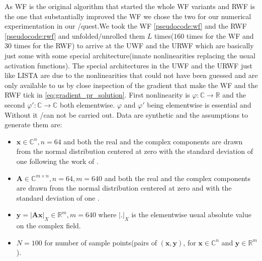As \ac{WF} is the original algorithm that started the whole \ac{WF} variants and \ac{RWF} is the one that substantially improved the \ac{WF} we chose the two 
for our numerical experimentation in our \du/\au quest.We took the \ac{WF}\cite{Candes2014} \cref{pseudocode:wf} and the 
\ac{RWF}\cite{Zhang2016} \cref{pseudocode:rwf} and unfolded/unrolled them $L$ times($160$ times for the \ac{WF} and $30$ times for 
the \ac{RWF}) to arrive at the \ac{UWF} and the \ac{URWF} which are basically just some \nn\cite{Goodfellow2016}\cite{Bishop2006}\index{\nn} 
with some special architecture(innate nonlinearities replacing the usual activation functions). The special architectures in the \ac{UWF} and the \ac{URWF} 
just like \ac{LISTA} are due to the nonlinearities that could not have been guessed and are only available to us by close inspection of the gradient that make 
the \ac{WF} and the \ac{RWF} tick in \cref{eq:gradient_pr_solution}. First nonlinearity is $\varphi \colon \mathbb{C} \rightarrow \mathbb{R}$ and the second $\varphi' \colon \mathbb{C} \rightarrow \mathbb{C}$ both elementwise. 
$\varphi$ and $\varphi'$ being elementwise is essential and Without it \ml/\dl can not be carried out. 
Data are synthetic and the assumptions to generate them are:
\begin{itemize}
  \item $\boldsymbol{x} \in \mathbb{C}^{n}, n=64$ and both the real and the complex components are drawn from the normal distribution 
  centered at zero with the standard deviation of one following the work of \cite{Naimipour2020}\cite{Naimipour2020a}.
  \item $\boldsymbol{A} \in \mathbb{C}^{m \times n}, n=64, m=640$ and both the real and the complex components are drawn from the normal distribution 
  centered at zero and with the standard deviation of one \cite{Naimipour2020}\cite{Naimipour2020a}.
  \item $\boldsymbol{y}= \left|\boldsymbol{A}\boldsymbol{x}\right|_{X} \in \mathbb{R}^m, m=640$ where $\left|\boldsymbol{.}\right|_X$ is the elementwise usual absolute value on the complex field.
  \item $N=100$ for number of sample points(pairs of $(\boldsymbol{x},\boldsymbol{y})$, for $\boldsymbol{x} \in \mathbb{C}^n$ and $\boldsymbol{y} \in \mathbb{R}^m$ ).
\end{itemize}


